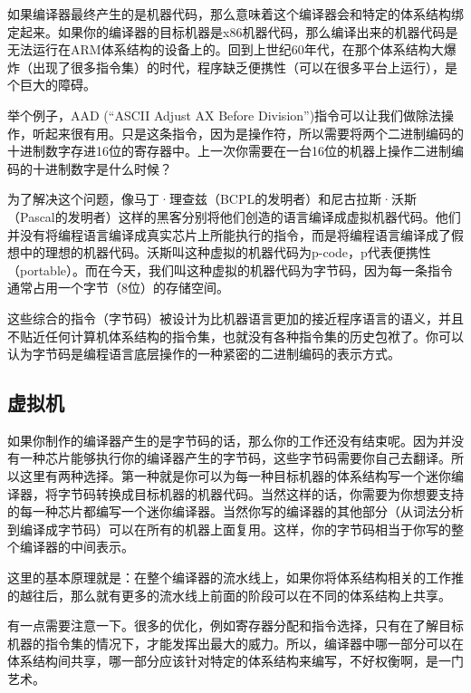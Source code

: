 \documentclass[cn,10pt,math=newtx,citestyle=gb7714-2015,bibstyle=gb7714-2015]{elegantbook}
\begin{document}
如果编译器最终产生的是机器代码，那么意味着这个编译器会和特定的体系结构绑定起来。如果你的编译器的目标机器是x86机器代码，那么编译出来的机器代码是无法运行在ARM体系结构的设备上的。回到上世纪60年代，在那个体系结构大爆炸（出现了很多指令集）的时代，程序缺乏便携性（可以在很多平台上运行），是个巨大的障碍。

\begin{tcolorbox}
举个例子，AAD (“ASCII Adjust AX Before Division”)指令可以让我们做除法操作，听起来很有用。只是这条指令，因为是操作符，所以需要将两个二进制编码的十进制数字存进16位的寄存器中。上一次你需要在一台16位的机器上操作二进制编码的十进制数字是什么时候？
\end{tcolorbox}

为了解决这个问题，像马丁·理查兹（BCPL的发明者）和尼古拉斯·沃斯（Pascal的发明者）这样的黑客分别将他们创造的语言编译成虚拟机器代码。他们并没有将编程语言编译成真实芯片上所能执行的指令，而是将编程语言编译成了假想中的理想的机器代码。沃斯叫这种虚拟的机器代码为p-code，p代表便携性（portable）。而在今天，我们叫这种虚拟的机器代码为字节码，因为每一条指令通常占用一个字节（8位）的存储空间。

这些综合的指令（字节码）被设计为比机器语言更加的接近程序语言的语义，并且不贴近任何计算机体系结构的指令集，也就没有各种指令集的历史包袱了。你可以认为字节码是编程语言底层操作的一种紧密的二进制编码的表示方式。

\subsection{虚拟机}

如果你制作的编译器产生的是字节码的话，那么你的工作还没有结束呢。因为并没有一种芯片能够执行你的编译器产生的字节码，这些字节码需要你自己去翻译。所以这里有两种选择。第一种就是你可以为每一种目标机器的体系结构写一个迷你编译器，将字节码转换成目标机器的机器代码。当然这样的话，你需要为你想要支持的每一种芯片都编写一个迷你编译器。当然你写的编译器的其他部分（从词法分析到编译成字节码）可以在所有的机器上面复用。这样，你的字节码相当于你写的整个编译器的中间表示。

\begin{tcolorbox}
这里的基本原理就是：在整个编译器的流水线上，如果你将体系结构相关的工作推的越往后，那么就有更多的流水线上前面的阶段可以在不同的体系结构上共享。

有一点需要注意一下。很多的优化，例如寄存器分配和指令选择，只有在了解目标机器的指令集的情况下，才能发挥出最大的威力。所以，编译器中哪一部分可以在体系结构间共享，哪一部分应该针对特定的体系结构来编写，不好权衡啊，是一门艺术。
\end{tcolorbox}
\end{document}
